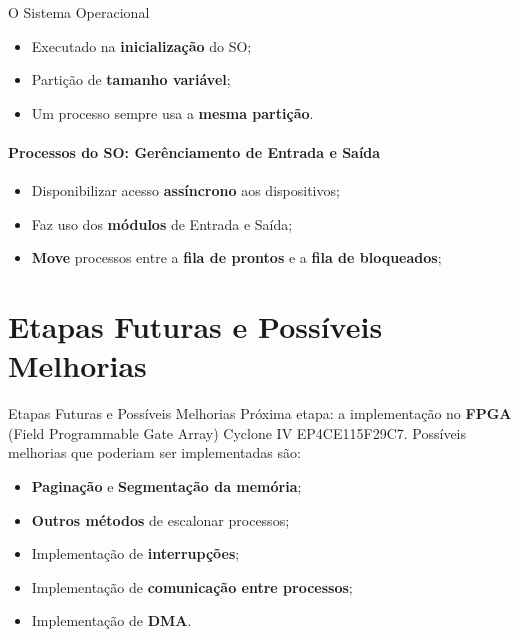 \documentclass[aspectratio=169]{beamer}
\begin{document}
\begin{frame}{O Sistema Operacional}
{\begin{itemize}
				
				\vspace{0.5cm}
				
				\item Executado na \textbf{inicialização} do SO;
				\vspace{0.5cm}
				\item Partição de \textbf{tamanho variável};
				\vspace{0.5cm}
				\item Um processo sempre usa a \textbf{mesma partição}.
				
			\end{itemize}
		}
		{
			\framesubtitle{Processos do SO: Gerênciamento de Entrada e Saída}
			\begin{itemize}
				\item Disponibilizar acesso \textbf{assíncrono} aos dispositivos;
				\vspace{0.5cm}
				\item Faz uso dos \textbf{módulos} de Entrada e Saída;
				\vspace{0.5cm}
				\item \textbf{Move} processos entre a \textbf{fila de prontos} e a \textbf{fila de bloqueados};
			\end{itemize}
		}
	\end{frame}
	
	
	
	\section{Etapas Futuras e Possíveis Melhorias}
	\begin{frame}{Etapas Futuras e Possíveis Melhorias}
		Próxima etapa: a implementação no \textbf{FPGA} (Field Programmable Gate Array) Cyclone IV EP4CE115F29C7.
		\vspace{0.5cm}
		Possíveis melhorias que poderiam ser implementadas são:
		
			\begin{itemize}
				\item \textbf{Paginação} e \textbf{Segmentação da memória};
				\vspace{0.5cm}
				\item \textbf{Outros métodos} de escalonar processos;
				\vspace{0.5cm}
				\item Implementação de \textbf{interrupções}; 
				\vspace{0.5cm}
				\item Implementação de \textbf{comunicação entre processos};
				\vspace{0.5cm}
				\item Implementação de \textbf{DMA}.
			\end{itemize}
	\end{frame}
	
	
	
\end{document}
